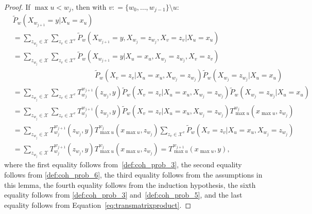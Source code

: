 \documentclass[10pt,a4paper]{paper}
\theoremstyle{definition}
\newcommand{\states}{\mathcal{X}}
\newcommand{\coloneqq}{:\!=}
\begin{document}
\begin{proof}
If $\max u<w_j$, then with $v\coloneqq\{w_0,\dots,w_{j-1}\}\setminus u$:
\begin{align*}
&\tilde{P}_w(X_{w_{j+1}}=y\vert X_u=x_u)\\[1,5mm]
&=\sum_{z_{w_j}\in\states}
\sum_{z_{v}\in\states^{v}}
\tilde{P}_w(X_{w_{j+1}}=y, X_{w_j}=z_{w_j}, X_v=z_v\vert X_u=x_u)\\
&=\sum_{z_{w_j}\in\states}
\sum_{z_{v}\in\states^{v}}
\tilde{P}_w(X_{w_{j+1}}=y\vert X_u=x_u, X_{w_j}=z_{w_j}, X_v=z_v)\\[-4mm]
&\quad\quad\quad\quad\quad\quad\quad\quad\quad\quad\quad~\,
\tilde{P}_w(X_v=z_v\vert X_u=x_u, X_{w_j}=z_{w_j})
\tilde{P}_w(X_{w_j}=z_{w_j}\vert X_u=x_u)\\[4mm]
&=\sum_{z_{w_j}\in\states}
\sum_{z_{v}\in\states^{v}}
T_{w_j}^{w_{j+1}}(z_{w_j},y)
\tilde{P}_w(X_v=z_v\vert X_u=x_u, X_{w_j}=z_{w_j})
\tilde{P}_w(X_{w_j}=z_{w_j}\vert X_u=x_u)\\
&=\sum_{z_{w_j}\in\states}
\sum_{z_{v}\in\states^{v}}
T_{w_j}^{w_{j+1}}(z_{w_j},y)
\tilde{P}_w(X_v=z_v\vert X_u=x_u, X_{w_j}=z_{w_j})
T_{\max u}^{w_{j}}(x_{\max u},z_{w_j})\\
&=\sum_{z_{w_j}\in\states}
T_{w_j}^{w_{j+1}}(z_{w_j},y)
T_{\max u}^{w_{j}}(x_{\max u},z_{w_j})
\sum_{z_{v}\in\states^{v}}
\tilde{P}_w(X_v=z_v\vert X_u=x_u, X_{w_j}=z_{w_j})
\\
&=\sum_{z_{w_j}\in\states}
T_{w_j}^{w_{j+1}}(z_{w_j},y)
T_{\max u}^{w_{j}}(x_{\max u},z_{w_j})
=T_{\max u}^{w_{j+1}}(x_{\max u},y),
\end{align*}
where the first equality follows from~\ref{def:coh_prob_3}, the second equality follows from \ref{def:coh_prob_6}, the third equality follows from the assumptions in this lemma, the fourth equality follows from the induction hypothesis, the sixth equality follows from \ref{def:coh_prob_3} and~\ref{def:coh_prob_5}, and the last equality follows from Equation~\eqref{eq:transmatrixproduct}.
\end{proof}
\end{document}
